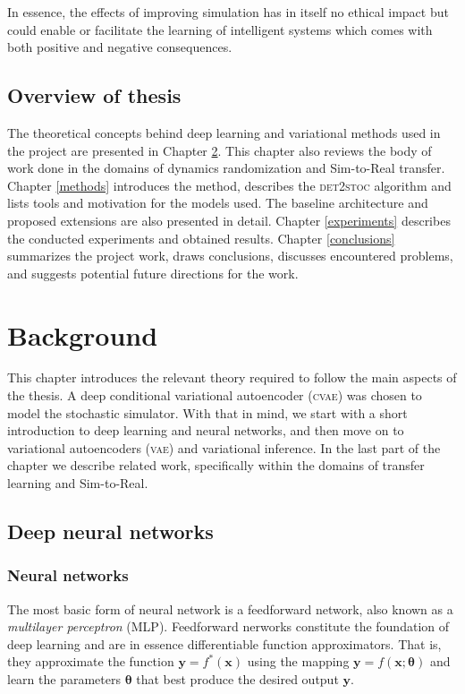 \documentclass{kththesis}
\newcommand{\vx}{\boldsymbol{x}}
\newcommand{\vy}{\boldsymbol{y}}
\newcommand{\vth}{\boldsymbol{\theta}}
\newcommand{\vae}{\textsc{vae}}
\newcommand{\cvae}{\textsc{cvae}}
\newcommand{\dettostoc}{\textsc{det2stoc}}
\begin{document}
In essence, the effects of improving simulation has in itself no ethical impact but could enable or facilitate the learning of intelligent systems which comes with both positive and negative consequences.

\section{Overview of thesis}
The theoretical concepts behind deep learning and variational methods used in the project are presented in Chapter \ref{background}. This chapter also reviews the body of work done in the domains of dynamics randomization and Sim-to-Real transfer. Chapter \ref{methods} introduces the method, describes the \dettostoc{} algorithm and lists tools and motivation for the models used. The baseline architecture and proposed extensions are also presented in detail. Chapter \ref{experiments} describes the conducted experiments and obtained results. Chapter \ref{conclusions} summarizes the project work, draws conclusions, discusses encountered problems, and suggests potential future directions for the work.

\chapter{Background}
\label{background}
This chapter introduces the relevant theory required to follow the main aspects of the thesis. A deep conditional variational autoencoder (\cvae{}) was chosen to model the stochastic simulator. With that in mind, we start with a short introduction to deep learning and neural networks, and then move on to variational autoencoders (\vae{}) and variational inference. In the last part of the chapter we describe related work, specifically within the domains of transfer learning and Sim-to-Real.


\section{Deep neural networks}
\subsection{Neural networks}
The most basic form of neural network is a feedforward network, also known as a \emph{multilayer perceptron} (MLP). Feedforward nerworks constitute the foundation of deep learning and are in essence differentiable function approximators. That is, they approximate the function $\vy=f^{*}(\vx)$ using the mapping $\vy = f(\vx; \vth)$ and learn the parameters $\pmb{\theta}$ that best produce the desired output $\vy$.
\end{document}
